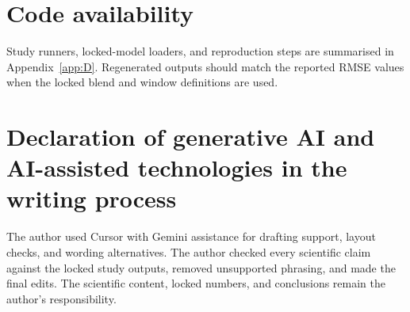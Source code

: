 \section*{Code availability}

Study runners, locked-model loaders, and reproduction steps are summarised in Appendix~\ref{app:D}. Regenerated outputs should match the reported RMSE values when the locked blend and window definitions are used.

\section*{Declaration of generative AI and AI-assisted technologies in the writing process}

The author used Cursor with Gemini assistance for drafting support, layout checks, and wording alternatives. The author checked every scientific claim against the locked study outputs, removed unsupported phrasing, and made the final edits. The scientific content, locked numbers, and conclusions remain the author's responsibility.
